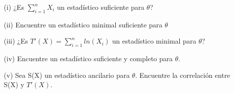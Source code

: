 \begin{enumerate}
    \begin{itemize}
        \item[(i)] ¿Es $\sum\limits_{i=1}^{n}X_i$ un estadístico suficiente para $\theta$?
        
        \item[(ii)] Encuentre un estadístico minimal suficiente para $\theta$
    
        \item[(iii)]  ¿Es $T'(X)=\sum\limits_{i=1}^{n}ln(X_i)$ un estadístico minimal para $\theta$?
        
        \item[(iv)] Encuentre un estadístico suficiente y completo para $\theta$.
        
        \item[(v)] Sea S(X) un estadístico ancilario para $\theta$. Encuentre la correlación entre S(X) y $T'(X)$.
        
    \end{itemize}
    
\end{enumerate}




